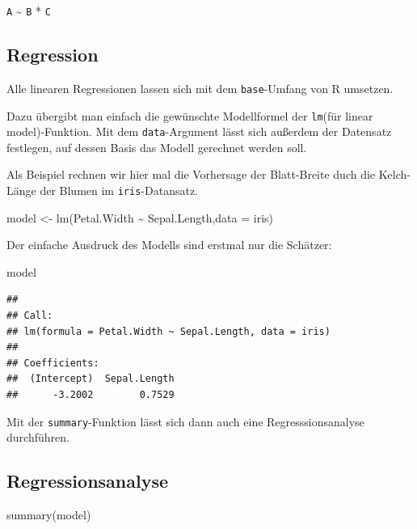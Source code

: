 \documentclass[
]{book}
\newenvironment{Shaded}{\begin{snugshade}}{\end{snugshade}}
\newcommand{\AttributeTok}[1]{\textcolor[rgb]{0.77,0.63,0.00}{#1}}
\newcommand{\FunctionTok}[1]{\textcolor[rgb]{0.00,0.00,0.00}{#1}}
\newcommand{\NormalTok}[1]{#1}
\newcommand{\OtherTok}[1]{\textcolor[rgb]{0.56,0.35,0.01}{#1}}
\newcommand{\SpecialCharTok}[1]{\textcolor[rgb]{0.00,0.00,0.00}{#1}}
\begin{document}
\texttt{A} \textasciitilde{} \texttt{B} * \texttt{C}

\hypertarget{regression}{%
\subsection{Regression}\label{regression}}

Alle linearen Regressionen lassen sich mit dem \texttt{base}-Umfang von R umsetzen.

Dazu übergibt man einfach die gewünschte Modellformel der \texttt{lm}(für linear model)-Funktion. Mit dem \texttt{data}-Argument lässt sich außerdem der Datensatz festlegen, auf dessen Basis das Modell gerechnet werden soll.

Als Beispiel rechnen wir hier mal die Vorhersage der Blatt-Breite duch die Kelch-Länge der Blumen im \texttt{iris}-Datansatz.

\begin{Shaded}
\begin{Highlighting}[]
\NormalTok{model }\OtherTok{\textless{}{-}} \FunctionTok{lm}\NormalTok{(Petal.Width }\SpecialCharTok{\textasciitilde{}}\NormalTok{ Sepal.Length,}\AttributeTok{data =}\NormalTok{ iris)}
\end{Highlighting}
\end{Shaded}

Der einfache Ausdruck des Modells sind erstmal nur die Schätzer:

\begin{Shaded}
\begin{Highlighting}[]
\NormalTok{model}
\end{Highlighting}
\end{Shaded}

\begin{verbatim}
## 
## Call:
## lm(formula = Petal.Width ~ Sepal.Length, data = iris)
## 
## Coefficients:
##  (Intercept)  Sepal.Length  
##      -3.2002        0.7529
\end{verbatim}

Mit der \texttt{summary}-Funktion lässt sich dann auch eine Regresssionsanalyse durchführen.

\hypertarget{regressionsanalyse}{%
\subsection{Regressionsanalyse}\label{regressionsanalyse}}

\begin{Shaded}
\begin{Highlighting}[]
\FunctionTok{summary}\NormalTok{(model)}
\end{Highlighting}
\end{Shaded}
\end{document}
